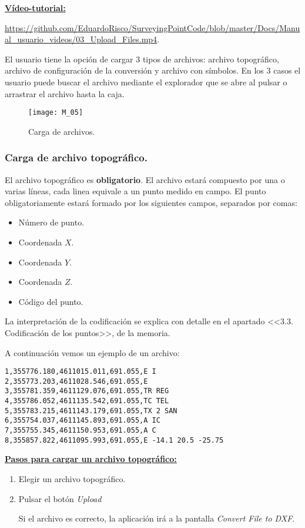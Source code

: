 \textbf{\underline{Vídeo-tutorial:}}

\url{https://github.com/EduardoRisco/SurveyingPointCode/blob/master/Docs/Manual_usuario_videos/03_Upload_Files.mp4}.

El usuario tiene la opción de cargar 3 tipos de archivos: archivo topográfico, archivo de configuración de la conversión y archivo con símbolos. En los 3 casos el usuario puede buscar el archivo mediante el explorador que se abre al pulsar o arrastrar el archivo hasta la caja.

\begin{figure}[H]
	\centering
	\texttt{[image: M\_05]}
	\caption{Carga de archivos.}
	\label{fig:M_05}
\end{figure}

\subsubsection{Carga de archivo topográfico.}

El archivo topográfico es \textbf{obligatorio}. El archivo estará compuesto por una o varias líneas, cada linea equivale a un punto medido en campo. El punto obligatoriamente estará formado por los siguientes campos, separados por comas:
\begin{itemize}
\item Número de punto.
\item Coordenada $X$.
\item Coordenada $Y$.
\item Coordenada $Z$.
\item Código del punto.
\end{itemize}
La interpretación de la codificación se explica con detalle en el apartado <<3.3. Codificación de los puntos>>, de la memoria.



A continuación vemos un ejemplo de un archivo:

\begin{verbatim}
1,355776.180,4611015.011,691.055,E I
2,355773.203,4611028.546,691.055,E
3,355781.359,4611129.076,691.055,TR REG
4,355786.052,4611135.542,691.055,TC TEL
5,355783.215,4611143.179,691.055,TX 2 SAN
6,355754.037,4611145.893,691.055,A IC
7,355755.345,4611150.953,691.055,A C
8,355857.822,4611095.993,691.055,E -14.1 20.5 -25.75
\end{verbatim}

\textbf{\underline{Pasos para cargar un archivo topográfico:} }

\begin{enumerate}

\item Elegir un archivo topográfico.
\item Pulsar el botón \emph{Upload}

Si el archivo es correcto, la aplicación irá a la pantalla \emph{Convert File to DXF}.

\end{enumerate}

